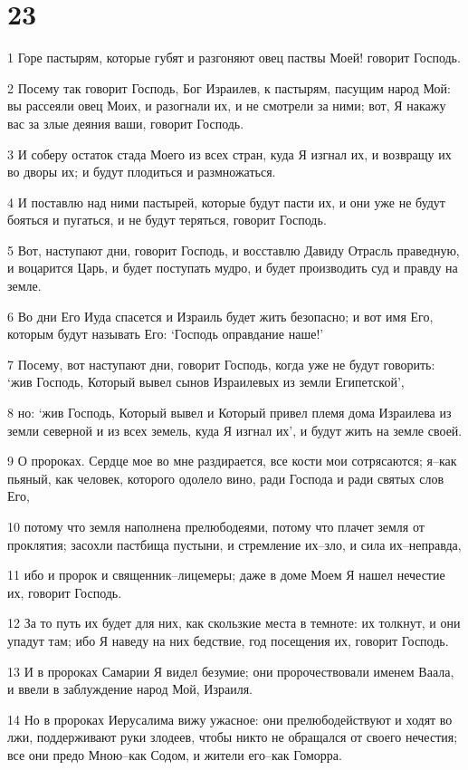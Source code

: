 \chapter{23}

\par 1 Горе пастырям, которые губят и разгоняют овец паствы Моей! говорит Господь.
\par 2 Посему так говорит Господь, Бог Израилев, к пастырям, пасущим народ Мой: вы рассеяли овец Моих, и разогнали их, и не смотрели за ними; вот, Я накажу вас за злые деяния ваши, говорит Господь.
\par 3 И соберу остаток стада Моего из всех стран, куда Я изгнал их, и возвращу их во дворы их; и будут плодиться и размножаться.
\par 4 И поставлю над ними пастырей, которые будут пасти их, и они уже не будут бояться и пугаться, и не будут теряться, говорит Господь.
\par 5 Вот, наступают дни, говорит Господь, и восставлю Давиду Отрасль праведную, и воцарится Царь, и будет поступать мудро, и будет производить суд и правду на земле.
\par 6 Во дни Его Иуда спасется и Израиль будет жить безопасно; и вот имя Его, которым будут называть Его: `Господь оправдание наше!'
\par 7 Посему, вот наступают дни, говорит Господь, когда уже не будут говорить: `жив Господь, Который вывел сынов Израилевых из земли Египетской',
\par 8 но: `жив Господь, Который вывел и Который привел племя дома Израилева из земли северной и из всех земель, куда Я изгнал их', и будут жить на земле своей.
\par 9 О пророках. Сердце мое во мне раздирается, все кости мои сотрясаются; я--как пьяный, как человек, которого одолело вино, ради Господа и ради святых слов Его,
\par 10 потому что земля наполнена прелюбодеями, потому что плачет земля от проклятия; засохли пастбища пустыни, и стремление их--зло, и сила их--неправда,
\par 11 ибо и пророк и священник--лицемеры; даже в доме Моем Я нашел нечестие их, говорит Господь.
\par 12 За то путь их будет для них, как скользкие места в темноте: их толкнут, и они упадут там; ибо Я наведу на них бедствие, год посещения их, говорит Господь.
\par 13 И в пророках Самарии Я видел безумие; они пророчествовали именем Ваала, и ввели в заблуждение народ Мой, Израиля.
\par 14 Но в пророках Иерусалима вижу ужасное: они прелюбодействуют и ходят во лжи, поддерживают руки злодеев, чтобы никто не обращался от своего нечестия; все они предо Мною--как Содом, и жители его--как Гоморра.

